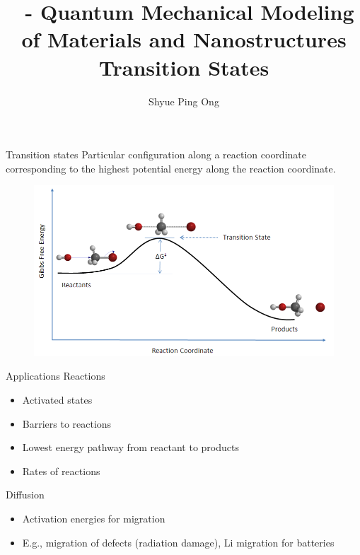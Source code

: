 \documentclass[aspectratio=169]{beamer}
\title[\classname Transition States]{\classname~- Quantum Mechanical Modeling of Materials and Nanostructures\\Transition States}
\author{Shyue Ping Ong}
\institute[UCSD]{University of California, San Diego\\
\medskip
}
\date{\classyear} %
\begin{document}
    \begin{frame}
        \titlepage %
    \end{frame}


    \begin{frame}{Transition states}
        Particular configuration along a reaction coordinate corresponding to the highest potential energy along the reaction coordinate.
        \begin{figure}
            \centering
            \includegraphics[width=0.5\linewidth]{lectures/figures/12_transition_state.png}
            \caption{}
        \end{figure}

    \end{frame}

    \begin{frame}{Applications}
        Reactions
        \begin{itemize}
            \item Activated states
            \item Barriers to reactions
            \item Lowest energy pathway from reactant to products
            \item Rates of reactions
        \end{itemize}

        Diffusion
        \begin{itemize}
            \item Activation energies for migration
            \item E.g., migration of defects (radiation damage), Li migration for batteries
        \end{itemize}
    \end{frame}
\end{document}
